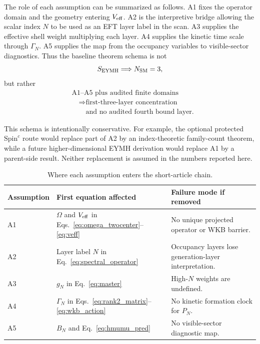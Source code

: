 \documentclass[11pt,a4paper]{article}
\begin{document}
The role of each assumption can be summarized as follows.
A1 fixes the operator domain and the geometry entering \(V_{\rm eff}\).
A2 is the interpretive bridge allowing the scalar index \(N\) to be used as an EFT layer label in the scan.
A3 supplies the effective shell weight multiplying each layer.
A4 supplies the kinetic time scale through \(\Gamma_N\).
A5 supplies the map from the occupancy variables to visible-sector diagnostics.
Thus the baseline theorem schema is not
\begin{equation}
    S_{\rm EYMH}\Longrightarrow N_{\rm SM}=3,
\end{equation}
but rather
\begin{equation}
    \begin{aligned}
    &\text{A1--A5 plus audited finite domains}
    \\
    &\quad\Longrightarrow
    \text{first-three-layer concentration}
    \\
    &\qquad\text{and no audited fourth bound layer}.
    \end{aligned}
    \label{eq:claim_schema}
\end{equation}

This schema is intentionally conservative.
For example, the optional protected \(\mathrm{Spin}^c\) route would replace part of A2 by an index-theoretic family-count theorem, while a future higher-dimensional EYMH derivation would replace A1 by a parent-side result.
Neither replacement is assumed in the numbers reported here.

\begin{table}[htbp]
\centering
\caption{Where each assumption enters the short-article chain.}
\label{tab:assumption_dependency}
\small
\setlength{\tabcolsep}{4pt}
\renewcommand{\arraystretch}{1.12}
\begin{tabular}{@{}l l l@{}}
\toprule
\textbf{Assumption} & \textbf{First equation affected} & \textbf{Failure mode if removed} \\
\midrule
A1 & \(\Omega\) and \(V_{\rm eff}\) in Eqs.~\eqref{eq:omega_twocenter}--\eqref{eq:veff} & No unique projected operator or WKB barrier. \\
A2 & Layer label \(N\) in Eq.~\eqref{eq:spectral_operator} & Occupancy layers lose generation-layer interpretation. \\
A3 & \(g_N\) in Eq.~\eqref{eq:master} & High-\(N\) weights are undefined. \\
A4 & \(\Gamma_N\) in Eqs.~\eqref{eq:rank2_matrix}--\eqref{eq:wkb_action} & No kinetic formation clock for \(P_N\). \\
A5 & \(B_N\) and Eq.~\eqref{eq:hmumu_pred} & No visible-sector diagnostic map. \\
\bottomrule
\end{tabular}
\end{table}
\end{document}
